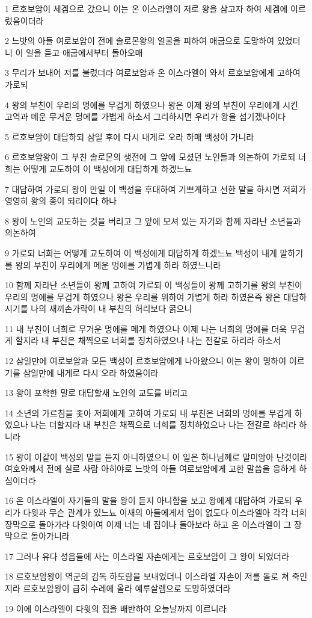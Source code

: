 \par 1 르호보암이 세겜으로 갔으니 이는 온 이스라엘이 저로 왕을 삼고자 하여 세겜에 이르렀음이더라
\par 2 느밧의 아들 여로보암이 전에 솔로몬왕의 얼굴을 피하여 애굽으로 도망하여 있었더니 이 일을 듣고 애굽에서부터 돌아오매
\par 3 무리가 보내어 저를 불렀더라 여로보암과 온 이스라엘이 와서 르호보암에게 고하여 가로되
\par 4 왕의 부친이 우리의 멍에를 무겁게 하였으나 왕은 이제 왕의 부친이 우리에게 시킨 고역과 메운 무거운 멍에를 가볍게 하소서 그리하시면 우리가 왕을 섬기겠나이다
\par 5 르호보암이 대답하되 삼일 후에 다시 내게로 오라 하매 백성이 가니라
\par 6 르호보암왕이 그 부친 솔로몬의 생전에 그 앞에 모셨던 노인들과 의논하여 가로되 너희는 어떻게 교도하여 이 백성에게 대답하게 하겠느뇨
\par 7 대답하여 가로되 왕이 만일 이 백성을 후대하여 기쁘게하고 선한 말을 하시면 저희가 영영히 왕의 종이 되리이다 하나
\par 8 왕이 노인의 교도하는 것을 버리고 그 앞에 모셔 있는 자기와 함께 자라난 소년들과 의논하여
\par 9 가로되 너희는 어떻게 교도하여 이 백성에게 대답하게 하겠느뇨 백성이 내게 말하기를 왕의 부친이 우리에게 메운 멍에를 가볍게 하라 하였느니라
\par 10 함께 자라난 소년들이 왕께 고하여 가로되 이 백성들이 왕께 고하기를 왕의 부친이 우리의 멍에를 무겁게 하였으나 왕은 우리를 위하여 가볍게 하라 하였은즉 왕은 대답하시기를 나의 새끼손가락이 내 부친의 허리보다 굵으니
\par 11 내 부친이 너희로 무거운 멍에를 메게 하였으나 이제 나는 너희의 멍에를 더욱 무겁게 할지라 내 부친은 채찍으로 너희를 징치하였으나 나는 전갈로 하리라 하소서
\par 12 삼일만에 여로보암과 모든 백성이 르호보암에게 나아왔으니 이는 왕이 명하여 이르기를 삼일만에 내게로 다시 오라 하였음이라
\par 13 왕이 포학한 말로 대답할새 노인의 교도를 버리고
\par 14 소년의 가르침을 좇아 저희에게 고하여 가로되 내 부친은 너희의 멍에를 무겁게 하였으나 나는 더할지라 내 부친은 채찍으로 너희를 징치하였으나 나는 전갈로 하리라 하니라
\par 15 왕이 이같이 백성의 말을 듣지 아니하였으니 이 일은 하나님께로 말미암아 난것이라 여호와께서 전에 실로 사람 아히야로 느밧의 아들 여로보암에게 고한 말씀을 응하게 하심이더라
\par 16 온 이스라엘이 자기들의 말을 왕이 듣지 아니함을 보고 왕에게 대답하여 가로되 우리가 다윗과 무슨 관계가 있느뇨 이새의 아들에게서 업이 없도다 이스라엘아 각각 너희 장막으로 돌아가라 다윗이여 이제 너는 네 집이나 돌아보라 하고 온 이스라엘이 그 장막으로 돌아가니라
\par 17 그러나 유다 성읍들에 사는 이스라엘 자손에게는 르호보암이 그 왕이 되었더라
\par 18 르호보암왕이 역군의 감독 하도람을 보내었더니 이스라엘 자손이 저를 돌로 쳐 죽인지라 르호보암왕이 급히 수레에 올라 예루살렘으로 도망하였더라
\par 19 이에 이스라엘이 다윗의 집을 배반하여 오늘날까지 이르니라

